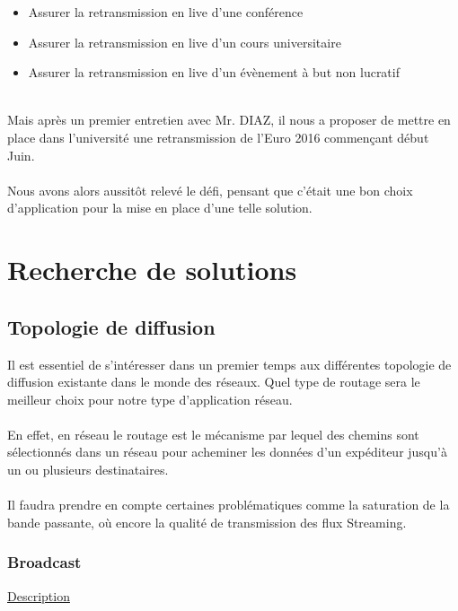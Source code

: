 \documentclass{report}
\begin{document}
   \begin{itemize}
       \item Assurer la retransmission en live d'une conférence
       \item Assurer la retransmission en live d'un cours universitaire
       \item Assurer la retransmission en live d'un évènement à but non lucratif
   \end{itemize} 


\hfill{\\}
Mais après un premier entretien avec Mr. DIAZ, il nous a proposer de mettre en place dans l'université une retransmission de l'Euro 2016 commençant début Juin.
\\
\\
Nous avons alors aussitôt relevé le défi, pensant que c'était une bon choix d'application pour la mise en place d'une telle solution.



\chapter{Recherche de solutions}
   
    \section{Topologie de diffusion}
    
    Il est essentiel de s'intéresser dans un premier temps  aux différentes topologie de diffusion existante dans le monde des réseaux. Quel type de routage sera le meilleur choix pour notre type d’application réseau.
    \\
    \\
    En effet, en réseau  le routage est le mécanisme par lequel des chemins sont sélectionnés dans un réseau pour acheminer les données d'un expéditeur jusqu'à un ou plusieurs destinataires. 
    \\
    \\
    Il faudra prendre en compte certaines problématiques comme la saturation de la bande passante, où encore la qualité de transmission des flux Streaming.


        \subsection{Broadcast}
     
        
    \underline{Description}
    \\
    
\end{document}
